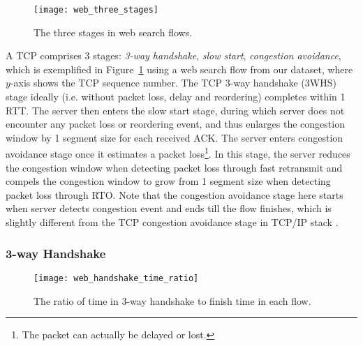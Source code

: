 \begin{figure}[th]
\centering
\texttt{[image: web\_three\_stages]}
\caption{The three stages in web search flows.}
\label{fig:web_three_stages}
\end{figure}

A TCP comprises 3 stages: \emph{3-way handshake}, \emph{slow start}, \emph{congestion avoidance}, which is exemplified in Figure~\ref{fig:web_three_stages} using a web search flow from our dataset, where $y$-axis shows the TCP sequence number. The TCP 3-way handshake (3WHS) stage ideally (i.e. without packet loss, delay and reordering) completes within 1 RTT. The server then enters the slow start stage, during which server does not encounter any packet loss or reordering event, and thus enlarges the congestion window by 1 segment size for each received ACK. The server enters congestion avoidance stage once it estimates a packet loss\footnote{The packet can actually be delayed or lost.}. In this stage, the server reduces the congestion window when detecting packet loss through fast retransmit\cite{rfc6675} and compels the congestion window to grow from 1 segment size when detecting packet loss through RTO. Note that the congestion avoidance stage here starts when server detects congestion event and ends till the flow finishes, which is slightly different from the TCP congestion avoidance stage in TCP/IP stack \cite{jacobson1988congestion}.


\subsubsection{3-way Handshake}

\begin{figure}[th]
\centering
\texttt{[image: web\_handshake\_time\_ratio]}
\caption{The ratio of time in 3-way handshake to finish time in each flow.}
\label{fig:web_handshake_ratio}
\end{figure}

